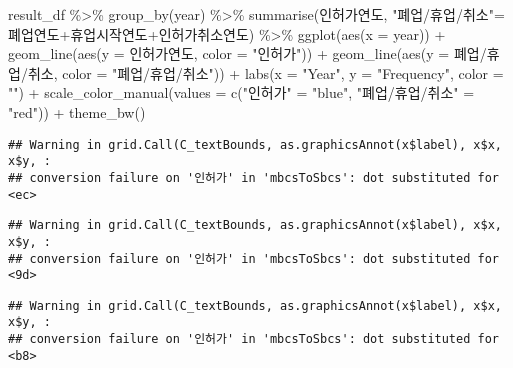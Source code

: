\documentclass[
]{book}
\newenvironment{Shaded}{\begin{snugshade}}{\end{snugshade}}
\newcommand{\AttributeTok}[1]{\textcolor[rgb]{0.77,0.63,0.00}{#1}}
\newcommand{\FunctionTok}[1]{\textcolor[rgb]{0.00,0.00,0.00}{#1}}
\newcommand{\NormalTok}[1]{#1}
\newcommand{\OtherTok}[1]{\textcolor[rgb]{0.56,0.35,0.01}{#1}}
\newcommand{\SpecialCharTok}[1]{\textcolor[rgb]{0.00,0.00,0.00}{#1}}
\newcommand{\StringTok}[1]{\textcolor[rgb]{0.31,0.60,0.02}{#1}}
\begin{document}
\begin{Shaded}
\begin{Highlighting}[]
\NormalTok{result\_df }\SpecialCharTok{\%\textgreater{}\%} 
  \FunctionTok{group\_by}\NormalTok{(year) }\SpecialCharTok{\%\textgreater{}\%}
  \FunctionTok{summarise}\NormalTok{(인허가연도, }\StringTok{"폐업/휴업/취소"}\OtherTok{=}\NormalTok{폐업연도}\SpecialCharTok{+}\NormalTok{휴업시작연도}\SpecialCharTok{+}\NormalTok{인허가취소연도) }\SpecialCharTok{\%\textgreater{}\%}
  \FunctionTok{ggplot}\NormalTok{(}\FunctionTok{aes}\NormalTok{(}\AttributeTok{x =}\NormalTok{ year)) }\SpecialCharTok{+}
  \FunctionTok{geom\_line}\NormalTok{(}\FunctionTok{aes}\NormalTok{(}\AttributeTok{y =}\NormalTok{ 인허가연도, }\AttributeTok{color =} \StringTok{"인허가"}\NormalTok{)) }\SpecialCharTok{+}
  \FunctionTok{geom\_line}\NormalTok{(}\FunctionTok{aes}\NormalTok{(}\AttributeTok{y =} \StringTok{\textasciigrave{}}\AttributeTok{폐업/휴업/취소}\StringTok{\textasciigrave{}}\NormalTok{, }\AttributeTok{color =} \StringTok{"폐업/휴업/취소"}\NormalTok{)) }\SpecialCharTok{+}
  \FunctionTok{labs}\NormalTok{(}\AttributeTok{x =} \StringTok{"Year"}\NormalTok{, }\AttributeTok{y =} \StringTok{"Frequency"}\NormalTok{, }\AttributeTok{color =} \StringTok{""}\NormalTok{) }\SpecialCharTok{+}
  \FunctionTok{scale\_color\_manual}\NormalTok{(}\AttributeTok{values =} \FunctionTok{c}\NormalTok{(}\StringTok{"인허가"} \OtherTok{=} \StringTok{"blue"}\NormalTok{, }\StringTok{"폐업/휴업/취소"} \OtherTok{=} \StringTok{"red"}\NormalTok{)) }\SpecialCharTok{+}
  \FunctionTok{theme\_bw}\NormalTok{()}
\end{Highlighting}
\end{Shaded}

\begin{verbatim}
## Warning in grid.Call(C_textBounds, as.graphicsAnnot(x$label), x$x, x$y, :
## conversion failure on '인허가' in 'mbcsToSbcs': dot substituted for <ec>
\end{verbatim}

\begin{verbatim}
## Warning in grid.Call(C_textBounds, as.graphicsAnnot(x$label), x$x, x$y, :
## conversion failure on '인허가' in 'mbcsToSbcs': dot substituted for <9d>
\end{verbatim}

\begin{verbatim}
## Warning in grid.Call(C_textBounds, as.graphicsAnnot(x$label), x$x, x$y, :
## conversion failure on '인허가' in 'mbcsToSbcs': dot substituted for <b8>
\end{verbatim}
\end{document}
